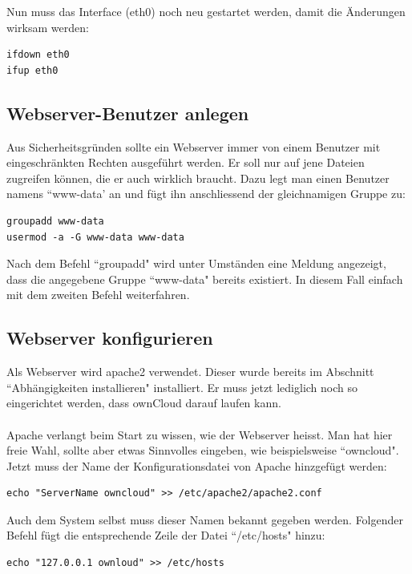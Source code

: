 Nun muss das Interface (eth0) noch neu gestartet werden, damit die Änderungen wirksam werden:

\begin{lstlisting}
ifdown eth0
ifup eth0
\end{lstlisting}

\subsection{Webserver-Benutzer anlegen}
Aus Sicherheitsgründen sollte ein Webserver immer von einem Benutzer mit eingeschränkten Rechten ausgeführt werden. Er soll nur auf jene Dateien zugreifen können, die er auch wirklich braucht. Dazu legt man einen Benutzer namens ``www-data' an und fügt ihn anschliessend der gleichnamigen Gruppe zu:

\begin{lstlisting}
groupadd www-data
usermod -a -G www-data www-data
\end{lstlisting}

Nach dem Befehl ``groupadd" wird unter Umständen eine Meldung angezeigt, dass die angegebene Gruppe ``www-data" bereits existiert. In diesem Fall einfach mit dem zweiten Befehl weiterfahren.

\subsection{Webserver konfigurieren}
Als Webserver wird apache2 verwendet. Dieser wurde bereits im Abschnitt ``Abhängigkeiten installieren" installiert. Er muss jetzt lediglich noch so eingerichtet werden, dass ownCloud darauf laufen kann.
\\
\\
Apache verlangt beim Start zu wissen, wie der Webserver heisst. Man hat hier freie Wahl, sollte aber etwas Sinnvolles eingeben, wie beispielsweise ``owncloud".
\\
Jetzt muss der Name der Konfigurationsdatei von Apache hinzgefügt werden:

\begin{lstlisting}
echo "ServerName owncloud" >> /etc/apache2/apache2.conf
\end{lstlisting}

Auch dem System selbst muss dieser Namen bekannt gegeben werden. Folgender Befehl fügt die entsprechende Zeile der Datei ``/etc/hosts" hinzu:

\begin{lstlisting}
echo "127.0.0.1 ownloud" >> /etc/hosts
\end{lstlisting}

